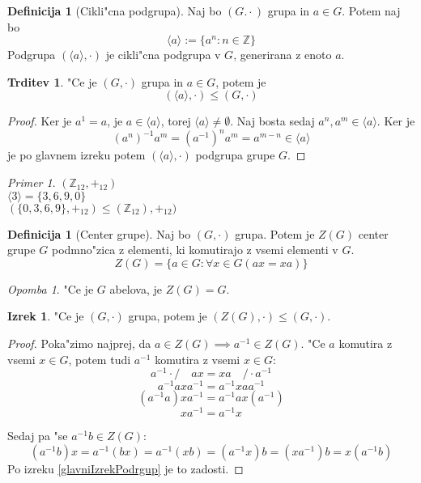 \documentclass[11pt, a4paper]{article}
\theoremstyle{definition}
\newtheorem{defn}[counter]{Definicija}
\newtheorem{claim}[counter]{Trditev}
\newtheorem{theorem}[counter]{Izrek}
\theoremstyle{remark}
\newtheorem*{ex}{Primer}
\newtheorem*{rem}{Opomba}
\newcommand{\Z}{\mathbb{Z}}
\begin{document}
	\begin{defn}[Cikli"cna podgrupa]\label{ciklicna_podgrupa}
		Naj bo $(G. \cdot)$ grupa in $a \in G$. Potem naj bo
		\[ \langle a \rangle := \lbrace a^n: n \in \Z \rbrace \]
		Podgrupa $(\langle a \rangle, \cdot)$ je cikli"cna podgrupa v $G$, generirana z enoto $a$.
	\end{defn}
	\begin{claim}
		"Ce je $(G, \cdot)$ grupa in $a \in G$, potem je
		\[ (\langle a \rangle, \cdot) \leq (G, \cdot) \]
	\end{claim}
	\begin{proof}
		Ker je $a^1 = a$, je $a \in \langle a \rangle$, torej $\langle a \rangle \neq \emptyset$. Naj bosta sedaj $a^n, a^m \in \langle a \rangle$.
		Ker je \[(a^n)^{-1}a^m = (a^{-1})^na^m = a^{m-n} \in \langle a \rangle \]
		je po glavnem izreku potem $(\langle a \rangle, \cdot)$ podgrupa grupe $G$.
	\end{proof}

	\begin{ex}
		$(\Z_{12}, +_{12})$
		\\
		$\langle 3 \rangle = \lbrace 3, 6, 9, 0 \rbrace$
		\\
		$(\lbrace 0, 3, 6, 9 \rbrace, +_{12}) \leq (\Z_{12}), +_{12})$
	\end{ex}

	\begin{defn}[Center grupe]
		Naj bo $(G, \cdot)$ grupa. Potem je $Z(G)$ center grupe $G$ podmno"zica z elementi, ki komutirajo z vsemi elementi v $G$.
		\[ Z(G) = \lbrace a \in G: \forall x \in G(ax=xa) \rbrace \]
	\end{defn}

	\begin{rem}
		"Ce je $G$ abelova, je $Z(G) = G$.
	\end{rem}
	\begin{theorem}
		"Ce je $(G, \cdot)$ grupa, potem je $(Z(G), \cdot) \leq (G, \cdot)$.
	\end{theorem}
	\begin{proof}		
		Poka"zimo najprej, da $a \in Z(G) \implies a^{-1} \in Z(G)$. "Ce $a$ komutira z vsemi $x \in G$, potem tudi $a^{-1}$ komutira z vsemi $x \in G$:
		\[ a^{-1} \cdot / \quad ax = xa \quad / \cdot a^{-1} \]
		\[ a^{-1}axa^{-1} = a^{-1}xaa^{-1} \]
		\[ (a^{-1}a)xa^{-1} = a^{-1}ax(a^{-1}) \]
		\[ xa^{-1} = a^{-1}x \]
		
		Sedaj pa "se $a^{-1}b \in Z(G)$:
		\[ (a^{-1}b)x = a^{-1}(bx) = a^{-1}(xb) = (a^{-1}x)b = (xa^{-1})b = x(a^{-1}b) \]
		Po izreku \ref{glavniIzrekPodrgup} je to zadosti.
	\end{proof}
\end{document}
